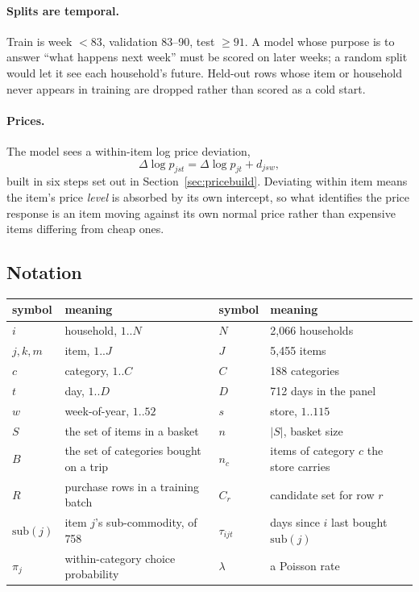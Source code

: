 \documentclass[11pt]{article}
\begin{document}
\paragraph{Splits are temporal.} Train is week $<83$, validation 83--90,
test $\ge91$. A model whose purpose is to answer ``what happens next week'' must be
scored on later weeks; a random split would let it see each household's future.
Held-out rows whose item or household never appears in training are dropped rather than
scored as a cold start.

\paragraph{Prices.} The model sees a within-item log price deviation,
\begin{equation}
\Delta\log p_{jst} = \Delta\log p_{jt} + d_{jsw},
\label{eq:price}
\end{equation}
built in six steps set out in Section~\ref{sec:pricebuild}. Deviating within item means
the item's price \emph{level} is absorbed by its own intercept, so what identifies the
price response is an item moving against its own normal price rather than expensive items
differing from cheap ones.

\subsection{Notation}
\label{sec:notation}

\begin{center}
\begin{tabular}{ll@{\ }ll}
\toprule
symbol & meaning & symbol & meaning \\
\midrule
$i$ & household, $1..N$ & $N$ & 2,066 households \\
$j,k,m$ & item, $1..J$ & $J$ & 5,455 items \\
$c$ & category, $1..C$ & $C$ & 188 categories \\
$t$ & day, $1..D$ & $D$ & 712 days in the panel \\
$w$ & week-of-year, $1..52$ & $s$ & store, $1..115$ \\
$S$ & the set of items in a basket & $n$ & $|S|$, basket size \\
$B$ & the set of categories bought on a trip & $n_c$ & items of category $c$ the store carries \\
$R$ & purchase rows in a training batch & $C_r$ & candidate set for row $r$ \\
$\mathrm{sub}(j)$ & item $j$'s sub-commodity, of 758 & $\tau_{ijt}$ & days since $i$ last bought $\mathrm{sub}(j)$ \\
$\pi_j$ & within-category choice probability & $\lambda$ & a Poisson rate \\
\bottomrule
\end{tabular}
\end{center}
\end{document}
